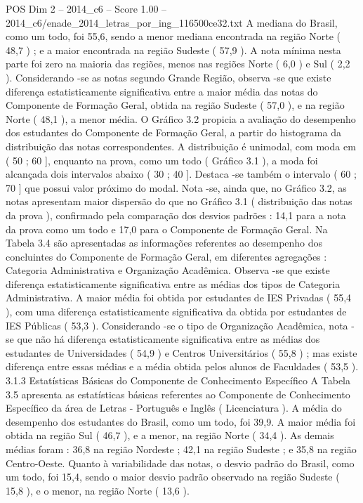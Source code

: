 \begin{textsample}{POS Dim 2 – 2014\_c6 – Score 1.00 – 2014\_c6/enade\_2014\_letras\_por\_ing\_116500ce32.txt}
A mediana do Brasil, como um todo, foi 55,6, sendo a menor mediana encontrada na região Norte ( 48,7 ) ; e a maior encontrada na região Sudeste ( 57,9 ).
A nota mínima nesta parte foi zero na maioria das regiões, menos nas regiões Norte ( 6,0 ) e Sul ( 2,2 ).
Considerando -se as notas segundo Grande Região, observa -se que existe diferença estatisticamente significativa entre a maior média das notas do Componente de Formação Geral, obtida na região Sudeste ( 57,0 ), e na região Norte ( 48,1 ), a menor média.
O Gráfico 3.2 propicia a avaliação do desempenho dos estudantes do Componente de Formação Geral, a partir do histograma da distribuição das notas correspondentes.
A distribuição é unimodal, com moda em ( 50 ; 60 ], enquanto na prova, como um todo ( Gráfico 3.1 ), a moda foi alcançada dois intervalos abaixo ( 30 ; 40 ].
Destaca -se também o intervalo ( 60 ; 70 ] que possui valor próximo do modal.
Nota -se, ainda que, no Gráfico 3.2, as notas apresentam maior dispersão do que no Gráfico 3.1 ( distribuição das notas da prova ), confirmado pela comparação dos desvios padrões : 14,1 para a nota da prova como um todo e 17,0 para o Componente de Formação Geral.
Na Tabela 3.4 são apresentadas as informações referentes ao desempenho dos concluintes do Componente de Formação Geral, em diferentes agregações : Categoria Administrativa e Organização Acadêmica.
Observa -se que existe diferença estatisticamente significativa entre as médias dos tipos de Categoria Administrativa.
A maior média foi obtida por estudantes de IES Privadas ( 55,4 ), com uma diferença estatisticamente significativa da obtida por estudantes de IES Públicas ( 53,3 ).
Considerando -se o tipo de Organização Acadêmica, nota -se que não há diferença estatisticamente significativa entre as médias dos estudantes de Universidades ( 54,9 ) e Centros Universitários ( 55,8 ) ; mas existe diferença entre essas médias e a média obtida pelos alunos de Faculdades ( 53,5 ). 3.1.3 Estatísticas Básicas do Componente de Conhecimento Específico A Tabela 3.5 apresenta as estatísticas básicas referentes ao Componente de Conhecimento Específico da área de Letras - Português e Inglês ( Licenciatura ).
A média do desempenho dos estudantes do Brasil, como um todo, foi 39,9.
A maior média foi obtida na região Sul ( 46,7 ), e a menor, na região Norte ( 34,4 ).
As demais médias foram : 36,8 na região Nordeste ; 42,1 na região Sudeste ; e 35,8 na região Centro-Oeste.
Quanto à variabilidade das notas, o desvio padrão do Brasil, como um todo, foi 15,4, sendo o maior desvio padrão observado na região Sudeste ( 15,8 ), e o menor, na região Norte ( 13,6 ).

\end{textsample}
